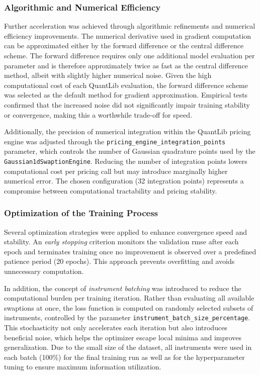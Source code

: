 \subsubsection{Algorithmic and Numerical Efficiency}
\label{subsubsec:algorithmic_and_numerical_efficiency}
Further acceleration was achieved through algorithmic refinements and numerical efficiency improvements. The numerical derivative used in gradient computation can be approximated either by the forward difference or the central difference scheme. The forward difference requires only one additional model evaluation per parameter and is therefore approximately twice as fast as the central difference method, albeit with slightly higher numerical noise. Given the high computational cost of each QuantLib evaluation, the forward difference scheme was selected as the default method for gradient approximation. Empirical tests confirmed that the increased noise did not significantly impair training stability or convergence, making this a worthwhile trade-off for speed.

Additionally, the precision of numerical integration within the QuantLib pricing engine was adjusted through the \texttt{pricing\_engine\_integration\_points} parameter, which controls the number of Gaussian quadrature points used by the \texttt{Gaussian1dSwaptionEngine}. Reducing the number of integration points lowers computational cost per pricing call but may introduce marginally higher numerical error. The chosen configuration (32 integration points) represents a compromise between computational tractability and pricing stability.

\subsubsection{Optimization of the Training Process}
Several optimization strategies were applied to enhance convergence speed and stability. An \textit{early stopping} criterion monitors the validation \ac{rmse} after each epoch and terminates training once no improvement is observed over a predefined patience period (20 epochs). This approach prevents overfitting and avoids unnecessary computation.

In addition, the concept of \textit{instrument batching} was introduced to reduce the computational burden per training iteration. Rather than evaluating all available swaptions at once, the loss function is computed on randomly selected subsets of instruments, controlled by the parameter \texttt{instrument\_batch\_size\_percentage}. This stochasticity not only accelerates each iteration but also introduces beneficial noise, which helps the optimizer escape local minima and improves generalization. Due to the small size of the dataset, all instruments were used in each batch (100\%) for the final training run as well as for the hyperparameter tuning to ensure maximum information utilization.

